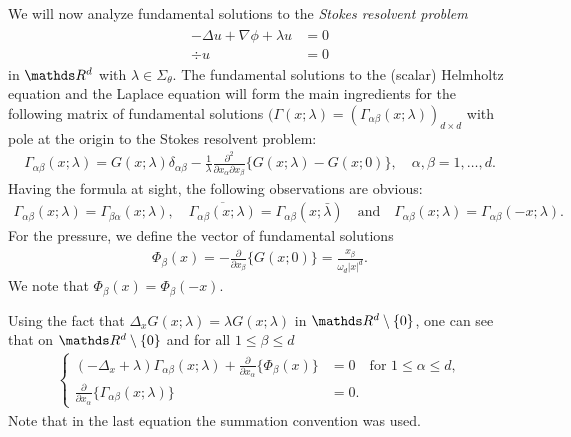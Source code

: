 We will now analyze fundamental solutions to the \emph{Stokes resolvent problem}
\begin{align}
  \label{eq:stokesResolventProblem}
  \begin{alignedat}{1}
  -\Delta u + \nabla \phi + \lambda u &= 0 \\
  \div u &= 0
  \end{alignedat}
\end{align}
in $\R^d$ with $\lambda \in \Sigma_\theta$.
  The fundamental solutions to the (scalar) Helmholtz equation and the Laplace equation will form the main ingredients for the following matrix of fundamental solutions $(\Gamma(x;\lambda) = (\Gamma_{\alpha\beta}(x;\lambda))_{d \times d}$ with pole at the origin to the Stokes resolvent problem:
  \begin{align}
    \label{eq:fundamentalMatrixStokes}
    \Gamma_{\alpha\beta}(x;\lambda) = G(x; \lambda) \delta_{\alpha\beta} - \frac{1}{\lambda} \frac{\partial^2}{\partial x_\alpha \partial x_\beta} \{ G(x; \lambda) - G(x; 0) \}, \quad \alpha,\beta = 1,\dots,d.
  \end{align}
  Having the formula at sight, the following observations are obvious:
  \begin{align*}
    \Gamma_{\alpha\beta}(x; \lambda) = \Gamma_{\beta\alpha}(x; \lambda), \quad 
    \overline{\Gamma_{\alpha\beta}(x; \lambda)} = \Gamma_{\alpha\beta}(x; \bar\lambda)
    \quad\text{and}\quad
    \Gamma_{\alpha\beta}(x; \lambda) = \Gamma_{\alpha\beta}(-x; \lambda).
  \end{align*}
  For the pressure, we define the vector of fundamental solutions
  \begin{align}
    \label{eq:fundamentalVectorPressure}
      \Phi_\beta(x) = -\frac{\partial}{\partial x_\beta} \{ G(x; 0) \} = \frac{x_\beta}{\omega_d |x|^d}.
  \end{align}
  We note that $\Phi_\beta(x) = \Phi_\beta(-x)$.

  Using the fact that $\Delta_x G(x; \lambda) = \lambda G(x; \lambda)$ in $\R^d \setminus \{0\}$, one can see that on $\R^d \setminus \{0\}$ and for all $1 \leq \beta \leq d$
  \begin{align}
    \label{eq:solutionStokesSystem}
    \begin{cases}
      (-\Delta_x + \lambda) \Gamma_{\alpha\beta}(x;\lambda) + \frac{\partial}{\partial x_\alpha} \{ \Phi_\beta(x) \} &= 0 \quad\text{for } 1 \leq \alpha \leq d, \\
      \frac{\partial}{\partial x_\alpha} \{ \Gamma_{\alpha\beta} (x; \lambda) \} &= 0.
    \end{cases}
  \end{align}
  Note that in the last equation the summation convention was used.

